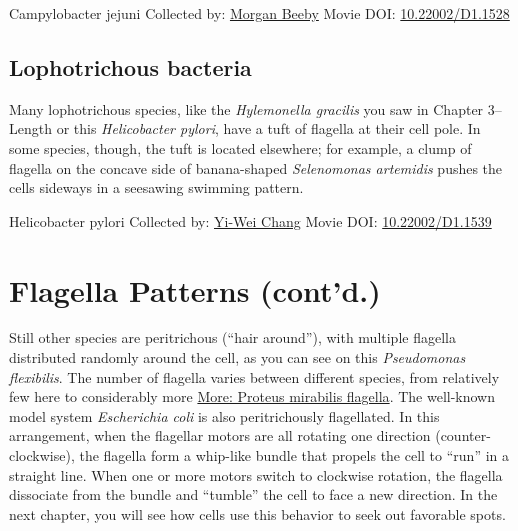 \documentclass[]{tufte-book}
\begin{document}
\hypertarget{htmlwidget-5eee90bb9cf932b30906}{}

\label{fig:6-4}Campylobacter jejuni Collected by: \protect\hyperlink{morgan_beeby}{Morgan Beeby} Movie DOI: \href{https://doi.org/10.22002/D1.1528}{10.22002/D1.1528}

\hypertarget{Lophotrichous_bacteria}{%
\subsection{Lophotrichous bacteria}\label{Lophotrichous_bacteria}}

Many lophotrichous species, like the \emph{Hylemonella gracilis} you saw in Chapter 3--Length or this \emph{Helicobacter pylori}, have a tuft of flagella at their cell pole. In some species, though, the tuft is located elsewhere; for example, a clump of flagella on the concave side of banana-shaped \emph{Selenomonas artemidis} pushes the cells sideways in a seesawing swimming pattern.



\hypertarget{htmlwidget-eac6741e7095a4ba8f30}{}

\label{fig:6-4a}Helicobacter pylori Collected by: \protect\hyperlink{yi-wei_chang}{Yi-Wei Chang} Movie DOI: \href{https://doi.org/10.22002/D1.1539}{10.22002/D1.1539}

\hypertarget{flagella-patterns-contd.}{%
\section{Flagella Patterns (cont'd.)}\label{flagella-patterns-contd.}}

Still other species are peritrichous (``hair around''), with multiple flagella distributed randomly around the cell, as you can see on this \emph{Pseudomonas flexibilis}. The number of flagella varies between different species, from relatively few here to considerably more \protect\hyperlink{Proteus_mirabilis_flagella}{More: Proteus mirabilis flagella}. The well-known model system \emph{Escherichia coli} is also peritrichously flagellated. In this arrangement, when the flagellar motors are all rotating one direction (counter-clockwise), the flagella form a whip-like bundle that propels the cell to ``run'' in a straight line. When one or more motors switch to clockwise rotation, the flagella dissociate from the bundle and ``tumble'' the cell to face a new direction. In the next chapter, you will see how cells use this behavior to seek out favorable spots.
\end{document}
